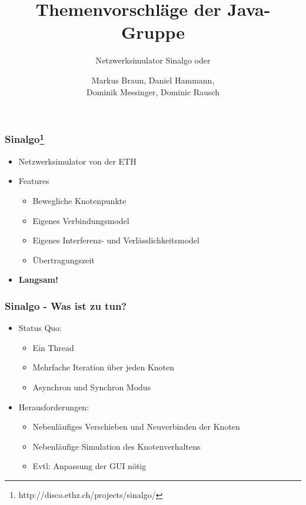 \documentclass[24pt]{beamer}
\title{Themenvorschläge der Java-Gruppe}
\subtitle{Netzwerksimulator Sinalgo oder}
\author{Markus Braun, Daniel Hammann,\\ 
	Dominik Messinger, Dominic Rausch}
\begin{document}
	\maketitle

	\begin{frame}[c]\frametitle{Sinalgo\footnote{http://disco.ethz.ch/projects/sinalgo/} }
		\begin{itemize}
			\item Netzwerksimulator von der ETH
			\item Features
			\begin{itemize}
				\item Bewegliche Knotenpunkte
				\item Eigenes Verbindungsmodel
				\item Eigenes Interferenz- und Verlässlichkeitsmodel
				\item Übertragungszeit
			\end{itemize}
			\item \textbf{Langsam!}
		\end{itemize}
	\end{frame}

	\begin{frame}[c]\frametitle{Sinalgo - Was ist zu tun?}
		\begin{itemize}
			\item Status Quo:
		    \begin{itemize}
		    	\item Ein Thread
		    	\item Mehrfache Iteration über jeden Knoten
		    	\item Asynchron und Synchron Modus
		    \end{itemize}
		    \item Herausforderungen:
		    \begin{itemize}
		    	\item Nebenläufiges Verschieben und Neuverbinden der Knoten
		    	\item Nebenläufige Simulation des Knotenverhaltens
		    	\item Evtl: Anpassung der GUI nötig
		    \end{itemize}
		\end{itemize}
	\end{frame}
	
\end{document}
